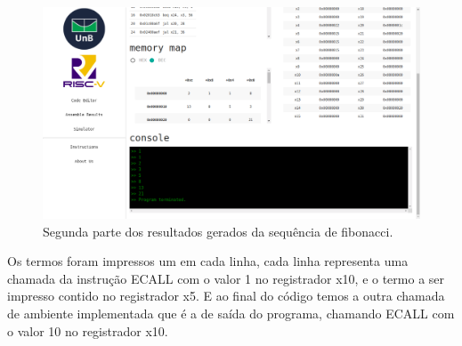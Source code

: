	\begin{figure}[h]
	  \centering
	  \includegraphics[width=14cm]{img/fibonacci_results_2.png}
	  \caption{Segunda parte dos resultados gerados da sequência de fibonacci.}
	  \label{fig:fib-results-2}
	\end{figure}

	Os termos foram impressos um em cada linha, cada linha representa uma chamada da instrução ECALL com o valor 1 no registrador x10, e o termo a ser impresso contido no registrador x5. E ao final do código temos a outra chamada de ambiente implementada que é a de saída do programa, chamando ECALL com o valor 10 no registrador x10.


